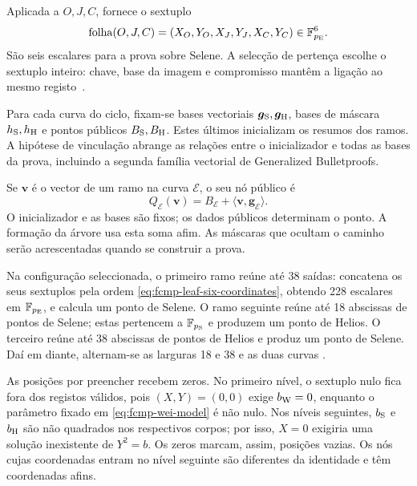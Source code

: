 Aplicada a \(O,J,C\), fornece o sextuplo
\begin{equation}
 \operatorname{folha}(O,J,C)
   =(X_O,Y_O,X_J,Y_J,X_C,Y_C)
       \in\mathbb F_{p_{\rm E}}^6.
 \label{eq:fcmp-leaf-six-coordinates}
\end{equation}
São seis escalares para a prova sobre Selene.
A selecção de pertença escolhe o sextuplo inteiro: chave,
base da imagem e compromisso mantêm a ligação ao mesmo
registo~\cite{monero-oxide-fcmp-source}.


Para cada curva do ciclo, fixam-se bases vectoriais
\(\boldsymbol g_{\rm S},\boldsymbol g_{\rm H}\), bases de
máscara \(h_{\rm S},h_{\rm H}\) e pontos públicos
\(B_{\rm S},B_{\rm H}\). Estes últimos inicializam os resumos
dos ramos. A hipótese de vinculação abrange as relações entre
o inicializador e todas as bases da prova, incluindo a segunda
família vectorial de Generalized Bulletproofs.

Se \(\boldsymbol v\) é o vector de um ramo na curva
\(\mathcal E\), o seu nó público é
\begin{equation}
 Q_{\mathcal E}(\boldsymbol v)
       =B_{\mathcal E}
          +\langle\boldsymbol v,\boldsymbol g_{\mathcal E}\rangle.
 \label{eq:fcmp-tree-node}
\end{equation}
O inicializador e as bases são fixos; os dados públicos
determinam o ponto. A formação da árvore usa esta soma
afim. As máscaras que ocultam o caminho serão acrescentadas
quando se construir a prova.

Na configuração seleccionada, o primeiro ramo reúne até
38 saídas: concatena os seus sextuplos pela ordem
\eqref{eq:fcmp-leaf-six-coordinates}, obtendo 228 escalares
em \(\mathbb F_{p_{\rm E}}\), e calcula um ponto de Selene.
O ramo seguinte reúne até 18 abscissas de pontos de Selene;
estas pertencem a \(\mathbb F_{p_{\rm S}}\) e produzem um
ponto de Helios. O terceiro reúne até 38 abscissas de
pontos de Helios e produz um ponto de Selene. Daí em diante,
alternam-se as larguras 18 e 38 e as duas curvas
\cite{monero-oxide-fcmp-source}.

As posições por preencher recebem zeros. No primeiro nível,
o sextuplo nulo fica fora dos registos válidos, pois
\((X,Y)=(0,0)\) exige \(b_{\rm W}=0\), enquanto o parâmetro
fixado em \eqref{eq:fcmp-wei-model} é não nulo.
Nos níveis seguintes, \(b_{\rm S}\) e \(b_{\rm H}\) são
não quadrados nos respectivos corpos; por isso, \(X=0\)
exigiria uma solução inexistente de \(Y^2=b\).
Os zeros marcam, assim, posições vazias. Os nós cujas
coordenadas entram no nível seguinte são diferentes da
identidade e têm coordenadas afins.


